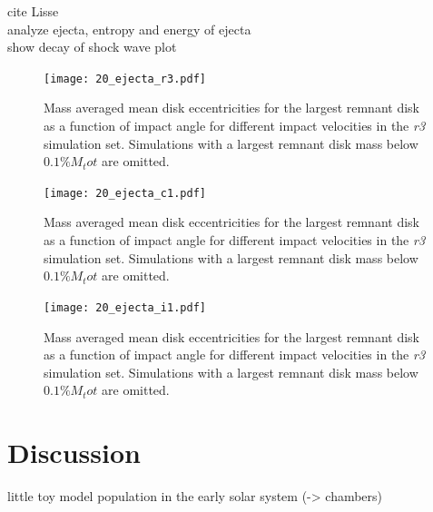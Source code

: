 {cite Lisse\\
analyze ejecta, entropy and energy of ejecta \\
show decay of shock wave plot\\ %

\begin{landscape}
\begin{figure}
\begin{center}
\texttt{[image: 20\_ejecta\_r3.pdf]}
\caption{Mass averaged mean disk eccentricities for the largest remnant disk as a function of impact angle for different impact velocities in the \emph{r3} simulation set. Simulations with a largest remnant disk mass below $0.1\% M_tot$ are omitted.}
\label{ch03_fig20a}
\end{center}
\end{figure}

\begin{figure}
\begin{center}
\texttt{[image: 20\_ejecta\_c1.pdf]}
\caption{Mass averaged mean disk eccentricities for the largest remnant disk as a function of impact angle for different impact velocities in the \emph{r3} simulation set. Simulations with a largest remnant disk mass below $0.1\% M_tot$ are omitted.}
\label{ch03_fig20b}
\end{center}
\end{figure}

\begin{figure}
\begin{center}
\texttt{[image: 20\_ejecta\_i1.pdf]}
\caption{Mass averaged mean disk eccentricities for the largest remnant disk as a function of impact angle for different impact velocities in the \emph{r3} simulation set. Simulations with a largest remnant disk mass below $0.1\% M_tot$ are omitted.}
\label{ch03_fig20c}
\end{center}
\end{figure}
\end{landscape}



\section{Discussion}
little toy model population in the early solar system (-> chambers) \\

}
